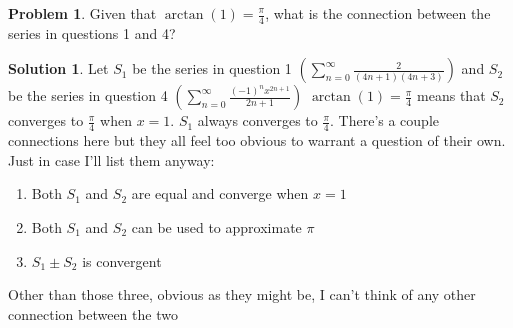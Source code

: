 \documentclass[10pt]{article}
\theoremstyle{definition}
\newtheorem{problem}{Problem}
\newtheorem{soln}{Solution}
\begin{document}
\begin{problem}
Given that $\arctan(1) = \frac{\pi}{4}$, what is the connection between the series in questions 1 and 4?
\end{problem}
\begin{soln}
    Let $S_1$ be the series in question 1 $\left(\sum_{n = 0}^{\infty} \frac{2}{(4n + 1)(4n + 3)}\right)$
    and $S_2$ be the series in question 4 $\left(\sum_{n = 0}^{\infty} \frac{(-1)^nx^{2n+1}}{2n + 1}\right)$
    $\arctan(1) = \frac{\pi}{4}$ means that $S_2$ converges to $\frac{\pi}{4}$ when $x=1$. $S_1$ always converges to $\frac{\pi}{4}$. There's a couple connections here but they all feel too obvious to warrant
    a question of their own. Just in case I'll list them anyway:

    \begin{enumerate}
        \item Both $S_1$ and $S_2$ are equal and converge when $x=1$
        \item Both $S_1$ and $S_2$ can be used to approximate $\pi$
        \item $S_1 \pm S_2$ is convergent
    \end{enumerate}

    \noindent Other than those three, obvious as they might be, I can't think of any other connection between the two
\end{soln}
\end{document}
